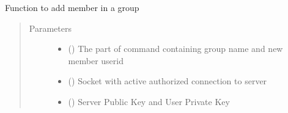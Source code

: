 \documentclass[letterpaper,10pt,english]{sphinxmanual}
\begin{document}
\begin{fulllineitems}
\label{\detokenize{userInputHandler:userInputHandler.addMemberInGroup}}
Function to add member in a group
\begin{quote}\begin{description}
\item[{Parameters}] \leavevmode\begin{itemize}
\item {} 
 () \textendash{} The part of command containing group name and new member userid

\item {} 
 () \textendash{} Socket with active authorized connection to server

\item {} 
 () \textendash{} Server Public Key and User Private Key

\end{itemize}

\end{description}\end{quote}

\end{fulllineitems}

\end{document}
